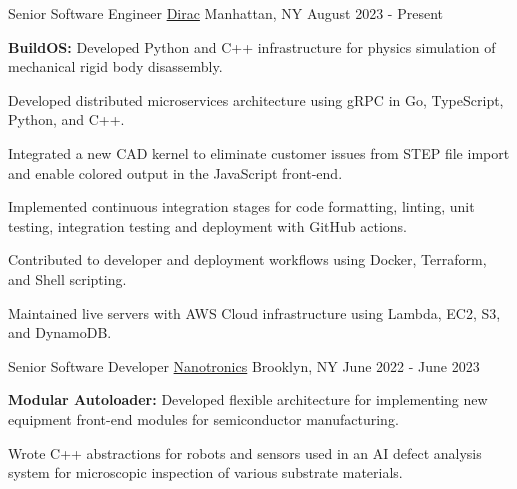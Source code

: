 

\begin{cventries}

  \cventry
    {Senior Software Engineer} %
    {\href{https://diracinc.com/}{Dirac}} %
    {Manhattan, NY} %
    {August 2023 - Present} %
    {
    \begin{cvitems} %
        \item{\textbf{BuildOS:} Developed Python and C++ infrastructure for physics simulation of mechanical rigid body disassembly.}
        \item{Developed distributed microservices architecture using gRPC in Go, TypeScript, Python, and C++.}
        \item{Integrated a new CAD kernel to eliminate customer issues from STEP file import and enable colored output in the JavaScript front-end.}
        \item{Implemented continuous integration stages for code formatting, linting, unit testing, integration testing and deployment with GitHub actions.}
        \item{Contributed to developer and deployment workflows using Docker, Terraform, and Shell scripting.}
        \item{Maintained live servers with AWS Cloud infrastructure using Lambda, EC2, S3, and DynamoDB.}
      \end{cvitems}
    }
  \cventry
    {Senior Software Developer} %
    {\href{https://nanotronics.co/}{Nanotronics}} %
    {Brooklyn, NY} %
    {June 2022 - June 2023} %
    {
    \begin{cvitems} %
        \item{\textbf{Modular Autoloader:} Developed flexible architecture for implementing new equipment front-end modules for semiconductor manufacturing.}
        \item{Wrote C++ abstractions for robots and sensors used in an AI defect analysis system for microscopic inspection of various substrate materials.}

\end{cvitems}}
\end{cventries}
